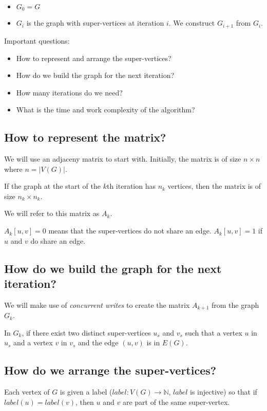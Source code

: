 \begin{itemize}
	\item $G_0 = G$
	\item $G_i$ is the graph with super-vertices at iteration $i$. We construct
	$G_{i + 1}$ from $G_i$.
\end{itemize}

Important questions:


\begin{itemize}
	\item How to represent and arrange the super-vertices?
	\item How do we build the graph for the next iteration?
	\item How many iterations do we need?
	\item What is the time and work complexity of the algorithm?
\end{itemize}

\subsection{How to represent the matrix?}
We will use an adjaceny matrix to start with. Initially, the matrix is of size
$n \times n$ where $n = |V(G)|$.

If the graph at the start of the $k$th iteration has $n_k$ vertices, then
the matrix is of size $n_k \times n_k$.

We will refer to this matrix as $A_k$.

$A_k[u, v] = 0$ means that the super-vertices do not share an edge. $A_k[u, v] = 1$ if $u$ and $v$ do share an edge.

\subsection{How do we build the graph for the next iteration?}
We will make use of \textit{concurrent writes} to create the
matrix $A_{k + 1}$ from the graph $G_k$.

In $G_k$, if there exist two distinct super-vertices $u_s$ and $v_s$ such that
a vertex $u$ in $u_s$ and a vertex $v$ in $v_s$  and the edge $(u, v)$
is in $E(G)$.

\subsection{How do we arrange the super-vertices?}
Each vertex of $G$ is given a label ($label: V(G) \to \mathbb{N}$, $label$ is injective) so that if $label(u) = label(v)$, then
$u$ and $v$ are part of the same super-vertex.

